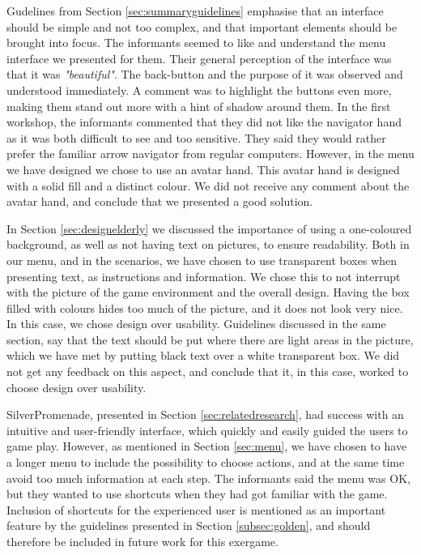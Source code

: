 Gudelines from Section \ref{sec:summaryguidelines} emphasise that an interface should be simple and not too complex, and that important elements should be brought into focus. The informants seemed to like and understand the menu interface we presented for them. Their general perception of the interface was that it was \emph{"beautiful"}. The back-button and the purpose of it was observed and understood immediately. A comment was to highlight the buttons even more, making them stand out more with a hint of shadow around them. In the first workshop, the informants commented that they did not like the navigator hand as it was both difficult to see and too sensitive. They said they would rather prefer the familiar arrow navigator from regular computers. However, in the menu we have designed we chose to use an avatar hand. This avatar hand is designed with a solid fill and a distinct colour. We did not receive any comment about the avatar hand, and conclude that we presented a good solution.

In Section \ref{sec:designelderly} we discussed the importance of using a one-coloured background, as well as not having text on pictures, to ensure readability. Both in our menu, and in the scenarios, we have chosen to use transparent boxes when presenting text, as instructions and information. We chose this to not interrupt with the picture of the game environment and the overall design. Having the box filled with colours hides too much of the picture, and it does not look very nice. In this case, we chose design over usability. Guidelines discussed in the same section, say that the text should be put where there are light areas in the picture, which we have met by putting black text over a white transparent box. We did not get any feedback on this aspect, and conclude that it, in this case, worked to choose design over usability.    

SilverPromenade, presented in Section \ref{sec:relatedresearch}, had success with an intuitive and user-friendly interface, which quickly and easily guided the users to game play. However, as mentioned in Section \ref{sec:menu}, we have chosen to have a longer menu to include the possibility to choose actions, and at the same time avoid too much information at each step. The informants said the menu was OK, but they wanted to use shortcuts when they had got familiar with the game. Inclusion of shortcuts for the experienced user is mentioned as an important feature by the guidelines presented in Section \ref{subsec:golden}, and should therefore be included in future work for this exergame.

